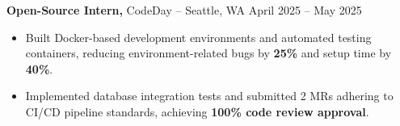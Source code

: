\documentclass[11pt]{article}
\begin{document}
\textbf{Open-Source Intern,} {CodeDay} -- Seattle, WA \hfill April 2025 -- May 2025
\vspace{-9pt}
\begin{itemize}
  \item Built Docker-based development environments and automated testing containers, reducing environment-related bugs by \textbf{25\%} and setup time by \textbf{40\%}.
  \item Implemented database integration tests and submitted 2 MRs adhering to CI/CD pipeline standards, achieving \textbf{100\% code review approval}.
\end{itemize}

\end{document}
